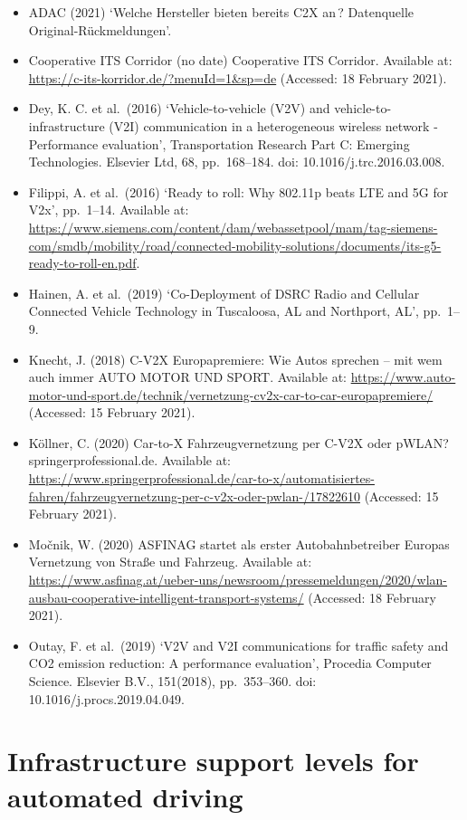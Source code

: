 \documentclass[
]{book}
\providecommand{\tightlist}{%
  \setlength{\itemsep}{0pt}\setlength{\parskip}{0pt}}
\begin{document}
\begin{itemize}
\tightlist
\item
  ADAC (2021) `Welche Hersteller bieten bereits C2X an\,? Datenquelle Original-Rückmeldungen'.
\item
  Cooperative ITS Corridor (no date) Cooperative ITS Corridor. Available at: \url{https://c-its-korridor.de/?menuId=1\&sp=de} (Accessed: 18 February 2021).
\item
  Dey, K. C. et al.~(2016) `Vehicle-to-vehicle (V2V) and vehicle-to-infrastructure (V2I) communication in a heterogeneous wireless network - Performance evaluation', Transportation Research Part C: Emerging Technologies. Elsevier Ltd, 68, pp.~168--184. doi: 10.1016/j.trc.2016.03.008.
\item
  Filippi, A. et al.~(2016) `Ready to roll: Why 802.11p beats LTE and 5G for V2x', pp.~1--14. Available at: \url{https://www.siemens.com/content/dam/webassetpool/mam/tag-siemens-com/smdb/mobility/road/connected-mobility-solutions/documents/its-g5-ready-to-roll-en.pdf}.
\item
  Hainen, A. et al.~(2019) `Co-Deployment of DSRC Radio and Cellular Connected Vehicle Technology in Tuscaloosa, AL and Northport, AL', pp.~1--9.
\item
  Knecht, J. (2018) C-V2X Europapremiere: Wie Autos sprechen -- mit wem auch immer \textbar{} AUTO MOTOR UND SPORT. Available at: \url{https://www.auto-motor-und-sport.de/technik/vernetzung-cv2x-car-to-car-europapremiere/} (Accessed: 15 February 2021).
\item
  Köllner, C. (2020) Car-to-X \textbar{} Fahrzeugvernetzung per C-V2X oder pWLAN? \textbar{} springerprofessional.de. Available at: \url{https://www.springerprofessional.de/car-to-x/automatisiertes-fahren/fahrzeugvernetzung-per-c-v2x-oder-pwlan-/17822610} (Accessed: 15 February 2021).
\item
  Močnik, W. (2020) ASFINAG startet als erster Autobahnbetreiber Europas Vernetzung von Straße und Fahrzeug. Available at: \url{https://www.asfinag.at/ueber-uns/newsroom/pressemeldungen/2020/wlan-ausbau-cooperative-intelligent-transport-systems/} (Accessed: 18 February 2021).
\item
  Outay, F. et al.~(2019) `V2V and V2I communications for traffic safety and CO2 emission reduction: A performance evaluation', Procedia Computer Science. Elsevier B.V., 151(2018), pp.~353--360. doi: 10.1016/j.procs.2019.04.049.
\end{itemize}

\hypertarget{infrastructure-support-levels-for-automated-driving}{%
\section{Infrastructure support levels for automated driving}\label{infrastructure-support-levels-for-automated-driving}}
\end{document}
